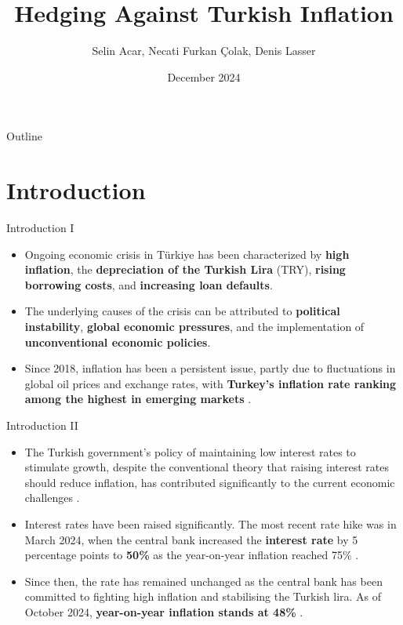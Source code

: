 \documentclass{beamer}
\title{Hedging Against Turkish Inflation}
\author{Selin Acar, Necati Furkan Çolak, Denis Lasser}
\date{December 2024}
\begin{document}
\frame{\titlepage}

\begin{frame}{Outline}
\tableofcontents
\end{frame}

\section{Introduction}
\begin{frame}{Introduction I}
\begin{itemize}
\item Ongoing economic crisis in Türkiye has been characterized by
\textbf{high inflation}, the \textbf{depreciation of the Turkish Lira}
(TRY), \textbf{rising borrowing costs}, and \textbf{increasing loan
defaults}.
\item The underlying causes of the crisis can be attributed to
\textbf{political instability}, \textbf{global economic pressures},
and the implementation of \textbf{unconventional economic policies}.
\item Since 2018, inflation has been a persistent issue, partly due to
fluctuations in global oil prices and exchange rates, with
\textbf{Turkey's inflation rate ranking among the highest in emerging
markets} \citep{yilmazkuday_2022}.
\end{itemize}
\end{frame}

\begin{frame}{Introduction II}
\begin{itemize}
\item The Turkish government's policy of maintaining low interest rates to
stimulate growth, despite the conventional theory that raising
interest rates should reduce inflation, has contributed significantly
to the current economic challenges \citep{kantur_ozcan_2021}.
\item Interest rates have been raised significantly. The most recent rate
hike was in March 2024, when the central bank increased the
\textbf{interest rate} by 5 percentage points to \textbf{50\%} as the
year-on-year inflation reached 75\% \citep{bloomberg_2024}.
\item Since then, the rate has remained unchanged as the central bank has
been committed to fighting high inflation and stabilising the Turkish
lira. As of October 2024, \textbf{year-on-year inflation stands at
48\%} \citep{bloomberg_2024}.
\end{itemize}
\end{frame}
\end{document}
